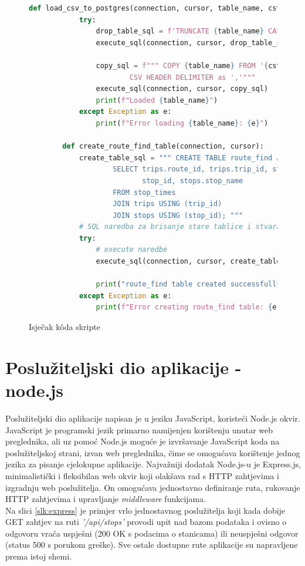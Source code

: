 \documentclass[zavrsnirad]{fer}
\begin{document}
\begin{figure}[H]
	\centering
	\begin{minipage}{0.9\linewidth}
		\begin{lstlisting}[language=Python]
		def load_csv_to_postgres(connection, cursor, table_name, csv_file_path):
			try:
				drop_table_sql = f'TRUNCATE {table_name} CASCADE;'
				execute_sql(connection, cursor, drop_table_sql)

				copy_sql = f""" COPY {table_name} FROM '{csv_file_path}' WITH
						CSV HEADER DELIMITER as ','"""
				execute_sql(connection, cursor, copy_sql)
				print(f"Loaded {table_name}")
			except Exception as e:
				print(f"Error loading {table_name}: {e}")

		def create_route_find_table(connection, cursor):
			create_table_sql = """ CREATE TABLE route_find AS
					SELECT trips.route_id, trips.trip_id, stop_times.stop_sequence,
						   stop_id, stops.stop_name
					FROM stop_times
					JOIN trips USING (trip_id)
					JOIN stops USING (stop_id); """
			# SQL naredba za brisanje stare tablice i stvaranje indeksa
			try:
				# execute naredbe
				execute_sql(connection, cursor, create_table_sql)

				print("route_find table created successfully.")
			except Exception as e:
				print(f"Error creating route_find table: {e}")
		\end{lstlisting}
	\end{minipage}
	\caption{Isječak k\^oda skripte}
	\label{slk:pytonskripta}
\end{figure}
\newpage
\section{Poslužiteljski dio aplikacije - node.js}
Poslužiteljski dio aplikacije napisan je u jeziku JavaScript, koristeći Node.js okvir. JavaScript je programski jezik primarno namijenjen korištenju unutar web preglednika, ali uz pomoć Node.js moguće je izvršavanje JavaScript koda na poslužiteljskoj strani, izvan web preglednika, čime se omogućava korištenje jednog jezika za pisanje cjelokupne aplikacije. Najvažniji dodatak Node.js-u je Express.js, minimalistički i fleksibilan web okvir koji olakšava rad s HTTP zahtjevima i izgradnju web poslužitelja. On omogućava jednostavno definiranje ruta, rukovanje HTTP zahtjevima i upravljanje \textit{middleware} funkcijama.\\
Na slici \ref{slk:express} je primjer vrlo jednostavnog poslužitelja koji kada dobije GET zahtjev na ruti \textit{'/api/stops'} provodi upit nad bazom podataka i ovisno o odgovoru vraća uspješni (200 OK s podacima o stanicama) ili neuspješni odgovor (status 500 s porukom greške). Sve ostale dostupne rute aplikacije su napravljene prema istoj shemi.
\end{document}

